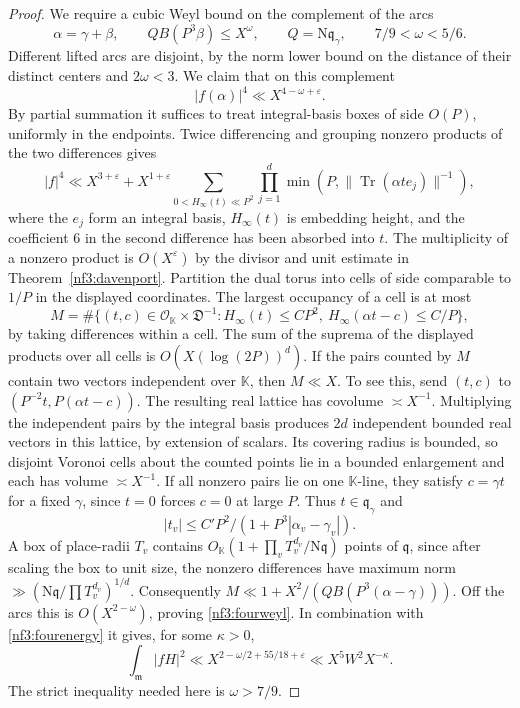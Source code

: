 \documentclass[11pt,letterpaper]{article}
\theoremstyle{definition}
\numberwithin{equation}{section}
\begin{document}
\begin{proof}
We require a cubic Weyl bound on the complement of the arcs
\[
 \alpha=\gamma+\beta,\qquad
 Q B(P^3\beta)\le X^\omega,\qquad Q=\mathrm N\mathfrak q_\gamma,
 \qquad 7/9<\omega<5/6.
\]
Different lifted arcs are disjoint, by the norm lower bound on the
distance of their distinct centers and $2\omega<3$.
We claim that on this complement
\begin{equation}\label{nf3:fourweyl}
                       |f(\alpha)|^4\ll X^{4-\omega+\varepsilon}.
\end{equation}
By partial summation it suffices to treat integral-basis boxes of
side $O(P)$, uniformly in the endpoints. Twice differencing and grouping
nonzero products of the two differences gives
\[
 |f|^4\ll X^{3+\varepsilon}
   + X^{1+\varepsilon}\!
   \sum_{0<H_\infty(t)\ll P^2}
   \prod_{j=1}^d\min(P,\|\operatorname{Tr}(\alpha t e_j)\|^{-1}),
\]
where the $e_j$ form an integral basis, $H_\infty(t)$ is embedding height,
and the coefficient $6$ in the second difference has been absorbed into
$t$. The multiplicity of a nonzero product is $O(X^\varepsilon)$ by the
divisor and unit estimate in Theorem~\ref{nf3:davenport}. Partition the
dual torus into cells of side comparable to $1/P$ in the displayed
coordinates. The largest occupancy of a cell is at most
\[
 M=\#\{(t,c)\in\mathcal O_{\mathbb K}\times\mathfrak D^{-1}:
                H_\infty(t)\le CP^2,\ H_\infty(\alpha t-c)\le C/P\},
\]
by taking differences within a cell. The sum of the suprema of the
displayed products over all cells is $O(X(\log(2P))^d)$.
If the pairs counted by $M$ contain two vectors independent over
$\mathbb K$, then $M\ll X$. To see this, send $(t,c)$ to
$(P^{-2}t,P(\alpha t-c))$. The resulting real lattice has covolume
$\asymp X^{-1}$. Multiplying the independent pairs by the integral basis
produces $2d$ independent bounded real vectors in this lattice, by
extension of scalars. Its covering radius is bounded, so disjoint
Voronoi cells about the counted points lie in a bounded enlargement
and each has volume $\asymp X^{-1}$. If all nonzero pairs lie on one
$\mathbb K$-line, they satisfy $c=\gamma t$ for a fixed $\gamma$,
since $t=0$ forces $c=0$ at large $P$. Thus $t\in\mathfrak q_\gamma$ and
\[
 |t_v|\le C'P^2/(1+P^3|\alpha_v-\gamma_v|).
\]
A box of place-radii $T_v$ contains
$O_{\mathbb K}(1+\prod_v T_v^{d_v}/\mathrm N\mathfrak q)$ points of
$\mathfrak q$, since after scaling the box to unit size, the nonzero differences
have maximum norm $\gg(\mathrm N\mathfrak q/\prod T_v^{d_v})^{1/d}$.
Consequently $M\ll 1+X^2/(Q B(P^3(\alpha-\gamma)))$. Off the arcs this
is $O(X^{2-\omega})$, proving \eqref{nf3:fourweyl}. In combination with
\eqref{nf3:fourenergy} it gives, for some $\kappa>0$,
\begin{equation}\label{nf3:fourminor}
            \int_{\mathfrak m}|fH|^2
             \ll X^{2-\omega/2+55/18+\varepsilon}
             \ll X^5W^2X^{-\kappa}.
\end{equation}
The strict inequality needed here is $\omega>7/9$.


\end{proof}
\end{document}
